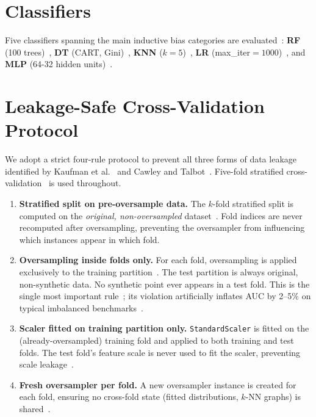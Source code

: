 \section{Classifiers}
\label{sec:setup_causal:classifiers}

Five classifiers spanning the main inductive bias categories are evaluated~\cite{ling2004exploration}: \textbf{RF} (100 trees)~\cite{breiman2001random}, \textbf{DT} (CART, Gini)~\cite{breiman1984cart}, \textbf{KNN} ($k=5$)~\cite{cover1967nearest}, \textbf{LR} (max\_iter$=1000$)~\cite{fernandez2018learning}, and \textbf{MLP} (64-32 hidden units)~\cite{haixiang2017learning}.


\section{Leakage-Safe Cross-Validation Protocol}
\label{sec:setup:leakage}

We adopt a strict four-rule protocol to prevent all three forms of data leakage identified by Kaufman et al.~\cite{kaufman2012leakage} and Cawley and Talbot~\cite{cawley2010over}.
Five-fold stratified cross-validation~\cite{kohavi1995study} is used throughout.

\begin{enumerate}[leftmargin=*, itemsep=4pt]
    \item \textbf{Stratified split on pre-oversample data.}
    The $k$-fold stratified split is computed on the \emph{original, non-oversampled} dataset~\cite{cawley2010over}.
    Fold indices are never recomputed after oversampling, preventing the oversampler from influencing which instances appear in which fold.

    \item \textbf{Oversampling inside folds only.}
    For each fold, oversampling is applied exclusively to the training partition~\cite{cawley2010over}.
    The test partition is always original, non-synthetic data.
    No synthetic point ever appears in a test fold.
    This is the single most important rule~\cite{johnson2019survey}; its violation artificially inflates AUC by 2--5\% on typical imbalanced benchmarks~\cite{kaufman2012leakage}.

    \item \textbf{Scaler fitted on training partition only.}
    \texttt{StandardScaler} is fitted on the (already-oversampled) training fold and applied to both training and test folds.
    The test fold's feature scale is never used to fit the scaler, preventing scale leakage~\cite{kaufman2012leakage}.

    \item \textbf{Fresh oversampler per fold.}
    A new oversampler instance is created for each fold, ensuring no cross-fold state (fitted distributions, $k$-NN graphs) is shared~\cite{cawley2010over}.
\end{enumerate}

